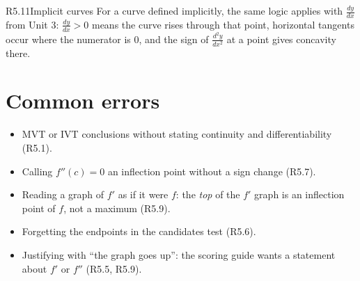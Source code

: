 \documentclass{apcalc}
\begin{document}
\begin{rulebox}{R5.11}{Implicit curves}
For a curve defined implicitly, the same logic applies with $\frac{dy}{dx}$ from Unit 3: $\frac{dy}{dx}>0$ means the curve rises through that point, horizontal tangents occur where the numerator is 0, and the sign of $\frac{d^2y}{dx^2}$ at a point gives concavity there.
\end{rulebox}

\section{Common errors}
\begin{itemize}
\item MVT or IVT conclusions without stating continuity and differentiability (R5.1).
\item Calling $f''(c)=0$ an inflection point without a sign change (R5.7).
\item Reading a graph of $f'$ as if it were $f$: the \emph{top} of the $f'$ graph is an inflection point of $f$, not a maximum (R5.9).
\item Forgetting the endpoints in the candidates test (R5.6).
\item Justifying with ``the graph goes up'': the scoring guide wants a statement about $f'$ or $f''$ (R5.5, R5.9).
\end{itemize}
\end{document}
